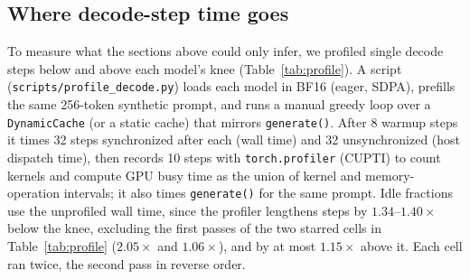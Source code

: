 \documentclass[11pt]{article}
\begin{document}
\subsection{Where decode-step time goes}
\label{sec:profile}
To measure what the sections above could only infer, we profiled single decode steps below and above each model's knee (Table~\ref{tab:profile}).
A script (\texttt{scripts/profile\_decode.py}) loads each model in BF16 (eager, SDPA), prefills the same 256-token synthetic prompt, and runs a manual greedy loop over a \texttt{DynamicCache} (or a static cache) that mirrors \texttt{generate()}.
After 8 warmup steps it times 32 steps synchronized after each (wall time) and 32 unsynchronized (host dispatch time), then records 10 steps with \texttt{torch.profiler} (CUPTI) to count kernels and compute GPU busy time as the union of kernel and memory-operation intervals; it also times \texttt{generate()} for the same prompt.
Idle fractions use the unprofiled wall time, since the profiler lengthens steps by $1.34$--$1.40\times$ below the knee, excluding the first passes of the two starred cells in Table~\ref{tab:profile} ($2.05\times$ and $1.06\times$), and by at most $1.15\times$ above it.
Each cell ran twice, the second pass in reverse order.
\end{document}
